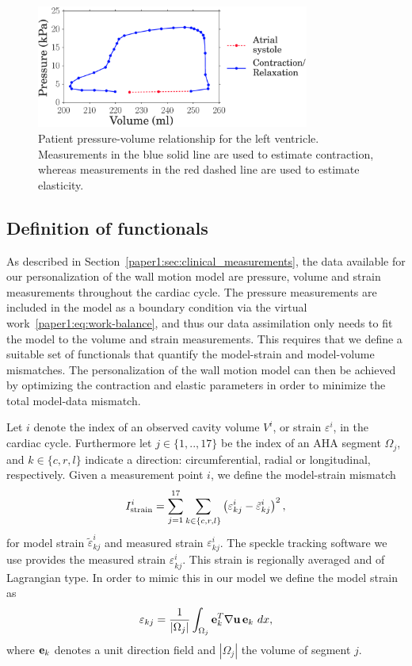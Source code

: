 \begin{figure}[htbp]
\centering
    \includegraphics[width=0.8\textwidth]{patient_pv_loop}
\caption{Patient pressure-volume relationship for the left
  ventricle. Measurements in the blue solid line are used to estimate
  contraction, whereas measurements in the red dashed line are used
  to estimate elasticity. }
\label{paper1:fig:pv_loop_phases}
\end{figure}


\subsection{Definition of functionals}
\label{paper1:sec:data_func}
As described in Section~\ref{paper1:sec:clinical_measurements}, the data
available for our personalization of the wall motion model are
pressure, volume and strain measurements throughout the cardiac
cycle. The pressure measurements are included in the model as a boundary condition 
via the virtual work~\eqref{paper1:eq:work-balance},
and thus our data assimilation only needs to fit the model to
the volume and strain measurements. This requires that
we define a suitable set of functionals that quantify the
model-strain and model-volume mismatches. The personalization of the wall motion model can
then be achieved by optimizing the contraction and elastic parameters
in order to minimize the total model-data mismatch.

Let $i$ denote the index of an observed cavity volume $V^i$, or strain
$\varepsilon^i$, in the cardiac cycle. Furthermore let $j \in
\{1,..,17\}$ be the index of an AHA segment $\Omega_j$, and $k \in
\{c,r,l\}$ indicate a direction: circumferential, radial or
longitudinal, respectively. Given a measurement point $i$, we define
the model-strain mismatch
\begin{equation}
 I_{\text{strain}}^i =  \sum_{j= 1}^{17} \sum_{k \in \{c,r,l\}}  \left( \varepsilon_{kj}^i -  \tilde{\varepsilon}_{kj}^i \right)^2,
\label{paper1:eq:strain_functional}
 \end{equation}
for model strain $\tilde{\varepsilon}_{kj}^i$ and measured strain
$\varepsilon_{kj}^i$. The speckle tracking software we use provides the measured strain $\varepsilon_{kj}^i$. 
This strain is regionally averaged and of Lagrangian type. In order to mimic this in our model we 
define the model strain as
\begin{equation}
\varepsilon_{kj} =  \frac{1}{|\Omega_j|}\int_{\Omega_j}  \mathbf{e}_k^T \nabla \mathbf{u} \, \mathbf{e}_k \ dx,
\label{paper1:eq:g_futhese nctional}
\end{equation}
where $\mathbf{e}_k$ denotes a unit direction field and
$|\Omega_j|$ the volume of segment $j$.

